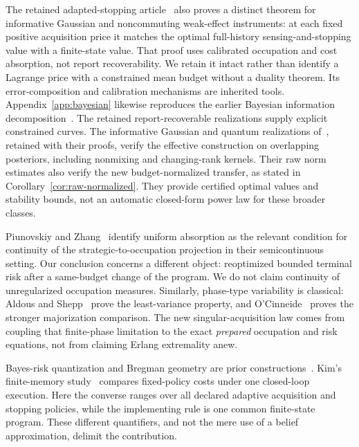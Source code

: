 The retained adapted-stopping article~\cite{GTFStopped} also proves a distinct theorem for informative Gaussian and noncommuting weak-effect instruments: at each fixed positive acquisition price it matches the optimal full-history sensing-and-stopping value with a finite-state value. That proof uses calibrated occupation and cost absorption, not report recoverability. We retain it intact rather than identify a Lagrange price with a constrained mean budget without a duality theorem. Its error-composition and calibration mechanisms are inherited tools. Appendix~\ref{app:bayesian} likewise reproduces the earlier Bayesian information decomposition~\cite{GTFBayes}. The retained report-recoverable realizations supply explicit constrained curves. The informative Gaussian and quantum realizations of~\cite{GTFExactBudget}, retained with their proofs, verify the effective construction on overlapping posteriors, including nonmixing and changing-rank kernels. Their raw norm estimates also verify the new budget-normalized transfer, as stated in Corollary~\ref{cor:raw-normalized}. They provide certified optimal values and stability bounds, not an automatic closed-form power law for these broader classes.

Piunovskiy and Zhang~\cite{PZ} identify uniform absorption as the relevant condition for continuity of the strategic-to-occupation projection in their semicontinuous setting. Our conclusion concerns a different object: reoptimized bounded terminal risk after a same-budget change of the program. We do not claim continuity of unregularized occupation measures. Similarly, phase-type variability is classical: Aldous and Shepp~\cite{AS} prove the least-variance property, and O'Cinneide~\cite{OC} proves the stronger majorization comparison. The new singular-acquisition law comes from coupling that finite-phase limitation to the exact \emph{prepared} occupation and risk equations, not from claiming Erlang extremality anew.

Bayes-risk quantization and Bregman geometry are prior constructions~\cite{Varshney}. Kim's finite-memory study~\cite{Kim} compares fixed-policy costs under one closed-loop execution. Here the converse ranges over all declared adaptive acquisition and stopping policies, while the implementing rule is one common finite-state program. These different quantifiers, and not the mere use of a belief approximation, delimit the contribution.

